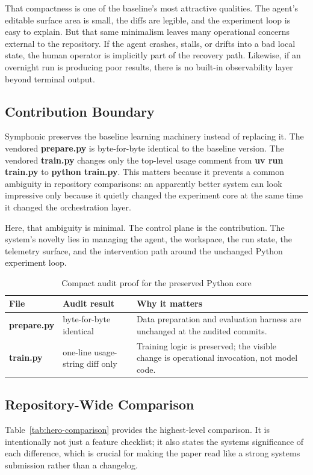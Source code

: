 \documentclass[conference]{IEEEtran}
\newcommand{\file}[1]{{\ttfamily\bfseries\textcolor{accentteal}{#1}}}
\begin{document}
That compactness is one of the baseline's most attractive qualities. The agent's editable surface area is small, the diffs are legible, and the experiment loop is easy to explain. But that same minimalism leaves many operational concerns external to the repository. If the agent crashes, stalls, or drifts into a bad local state, the human operator is implicitly part of the recovery path. Likewise, if an overnight run is producing poor results, there is no built-in observability layer beyond terminal output.

\subsection{Contribution Boundary}
Symphonic preserves the baseline learning machinery instead of replacing it. The vendored \file{prepare.py} is byte-for-byte identical to the baseline version. The vendored \file{train.py} changes only the top-level usage comment from \file{uv run train.py} to \file{python train.py}. This matters because it prevents a common ambiguity in repository comparisons: an apparently better system can look impressive only because it quietly changed the experiment core at the same time it changed the orchestration layer.

Here, that ambiguity is minimal. The control plane is the contribution. The system's novelty lies in managing the agent, the workspace, the run state, the telemetry surface, and the intervention path around the unchanged Python experiment loop.

\begin{table}[t]
\caption{Compact audit proof for the preserved Python core}
\label{tab:core-audit}
\centering
\footnotesize
\begin{tabularx}{\columnwidth}{p{} p{} Y}
\toprule
File & Audit result & Why it matters \\
\midrule
\file{prepare.py} & byte-for-byte identical & Data preparation and evaluation harness are unchanged at the audited commits. \\
\file{train.py} & one-line usage-string diff only & Training logic is preserved; the visible change is operational invocation, not model code. \\
\bottomrule
\end{tabularx}
\end{table}

\subsection{Repository-Wide Comparison}
Table~\ref{tab:hero-comparison} provides the highest-level comparison. It is intentionally not just a feature checklist; it also states the systems significance of each difference, which is crucial for making the paper read like a strong systems submission rather than a changelog.
\end{document}
